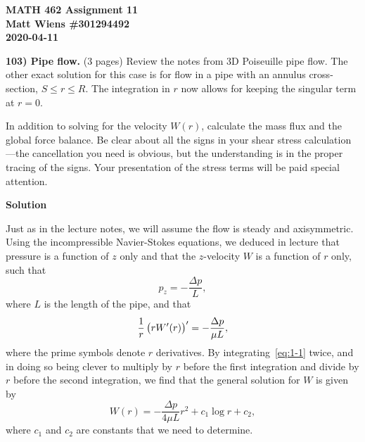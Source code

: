 \documentclass{article}
\begin{document}
\textbf{MATH 462 Assignment 11} \\
\textbf{Matt Wiens \#301294492} \\
\textbf{2020-04-11}

\textbf{103) Pipe flow.} (3 pages)
Review the notes from 3D Poiseuille pipe flow. The other exact solution
for this case is for flow in a pipe with an annulus cross-section, $S
\leq r \leq R$. The integration in $r$ now allows for keeping the singular term
at $r = 0$.

In addition to solving for the velocity $W(r)$, calculate the mass flux
and the global force balance. Be clear about all the signs in your shear
stress calculation---the cancellation you need is obvious, but the
understanding is in the proper tracing of the signs. Your presentation
of the stress terms will be paid special attention.

\newpage

\textbf{Solution}

Just as in the lecture notes, we will assume the flow is steady and
axisymmetric. Using the incompressible Navier-Stokes equations, we
deduced in lecture that pressure is a function of $z$ only and that the
$z$-velocity $W$ is a function of $r$ only, such that
%
\begin{equation*}
    p_z = - \frac{\Delta p}{L}
    ,
\end{equation*}
%
where $L$ is the length of the pipe, and that
%
\begin{equation}
    \frac{1}{r} \del{r W^\prime(r)}^\prime = - \frac{\Delta p}{\mu L}
    \label{eq:1-1}
    ,
\end{equation}
%
where the prime symbols denote $r$ derivatives. By integrating~\eqref{eq:1-1}
twice, and in doing so being clever to multiply by $r$ before the
first integration and divide by $r$ before the second integration, we
find that the general solution for $W$ is given by
%
\begin{equation*}
    W(r) = - \frac{\Delta p}{4 \mu L} r^2 + c_1 \log r + c_2
    ,
\end{equation*}
%
where $c_1$ and $c_2$ are constants that we need to determine.
\end{document}
